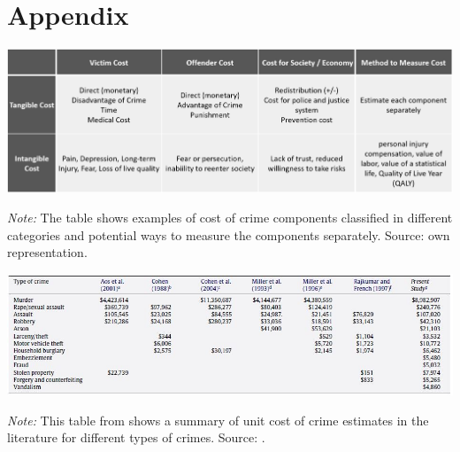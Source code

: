 \documentclass[a4paper,12pt]{article}
\begin{document}
\clearpage


   

\newpage

\section*{Appendix}



\begin{table}[!h]
\begin{minipage}{0.9\textwidth}
  \includegraphics[trim={0 0 0 0},width=\linewidth]{charts/table_unit_cost.png}
\begin{flushleft}
\footnotesize{\textit{Note:} The table shows examples of cost of crime components classified in different categories and potential ways to measure the components separately. Source: own representation.
\label{tab:unit_cost_crime}	
}
\end{flushleft}
\end{minipage}
\end{table}


\begin{table}[!h]
\begin{minipage}{0.9\textwidth}
  \includegraphics[trim={0 0 0 0},width=\linewidth]{charts/tab_lit_review.jpg}
\begin{flushleft}
\footnotesize{\textit{Note:} This table from \cite{collister} shows a summary of unit cost of crime estimates in the literature for different types of crimes. Source: \cite{collister}.
\label{tab:unit_cost_crime_lit_review}	
}
\end{flushleft}
\end{minipage}
\end{table}
\end{document}
